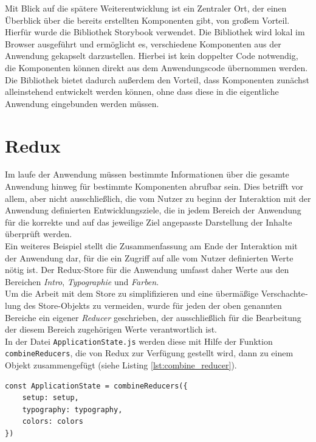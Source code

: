 Mit Blick auf die spätere Weiterentwicklung ist ein Zentraler Ort, der einen Überblick über die bereits erstellten Komponenten gibt, von großem Vorteil.
Hierfür wurde die Bibliothek Storybook\footnotemark{} verwendet. Die Bibliothek wird lokal im Browser ausgeführt und ermöglicht es, verschiedene Komponenten aus der Anwendung gekapselt darzustellen. Hierbei ist kein doppelter Code notwendig, die Komponenten können direkt aus dem Anwendungscode übernommen werden.
Die Bibliothek bietet dadurch außerdem den Vorteil, dass Komponenten zunächst alleinstehend entwickelt werden können, ohne dass diese in die eigentliche Anwendung eingebunden werden müssen.


\section{Redux}
\label{chap:redux}

Im laufe der Anwendung müssen bestimmte Informationen über die gesamte Anwendung hinweg für bestimmte Komponenten abrufbar sein. Dies betrifft vor allem, aber nicht ausschließlich, die vom Nutzer zu beginn der Interaktion mit der Anwendung definierten Entwicklungsziele, die in jedem Bereich der Anwendung für die korrekte und auf das jeweilige Ziel angepasste Darstellung der  Inhalte überprüft werden.\\
Ein weiteres Beispiel stellt die Zusammenfassung am Ende der Interaktion mit der Anwendung dar, für die ein Zugriff auf alle vom Nutzer definierten Werte nötig ist. Der Redux-Store für die Anwendung umfasst daher Werte aus den Bereichen \textit{Intro}, \textit{Typographie} und \textit{Farben}.\\

Um die Arbeit mit dem Store zu simplifizieren und eine übermäßige Ver­schach­te­lung des Store-Objekts zu vermeiden, wurde für jeden der oben genannten Bereiche ein eigener \textit{Reducer} geschrieben, der ausschließlich für die Bearbeitung der diesem Bereich zugehörigen Werte verantwortlich ist.\\
In der Datei \verb|ApplicationState.js| werden diese mit Hilfe der Funktion \verb|combineReducers|, die von Redux zur Verfügung gestellt wird, dann zu einem Objekt zusammengefügt (siehe Listing \ref{lst:combine_reducer}).

\begin{lstlisting}[caption={Zusammenfügen der dedizierten Reducer zu einem Objekt}, label=lst:combine_reducer]
  const ApplicationState = combineReducers({
    setup: setup,
    typography: typography,
    colors: colors
})
\end{lstlisting}


